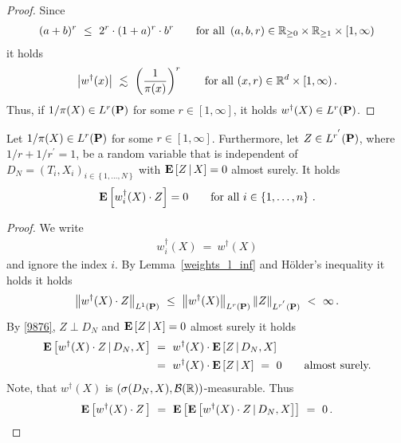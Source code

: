 \begin{proof}
  Since
  \begin{align*}
  (a+b)^r\
  \le \ 
  2^r\cdot (1+a)^r\cdot b^r
  \qquad
  \text{for all}\ 
  \left( a,b,r \right)
  \in
  \R_{\ge 0}\times\R_{\ge 1}\times [1,\infty)
  \end{align*}
 it holds
 \begin{align*}
   \left| w^\dagger(x) \right|
   \ 
   \lesssim
   \ 
   \left( 
     \frac{1}{\pi(x)}
   \right)^r
   \qquad
   \text{for all}\ 
   (x,r)\in\R^d\times [1,\infty)
   \,.
 \end{align*}
 Thus, if 
 $1/\pi(X)\in L^r(\P)$
 for some $r\in [1,\infty]$,
 it holds
 $w^\dagger(X)\in L^r(\P)$.
\end{proof}
\begin{lemma}
  \label{w.Z=0}
  Let 
 $1/\pi(X)\in L^r(\P)$
 for some $r\in [1,\infty]$.
 Furthermore, let 
 $Z\in L^{r^{'}}(\P)$,
 where
 $1/r + 1/r^{'}=1$,
  be a random variable that is independent of $D_N=(T_i,X_i)_{i\in \left\{
    1,\ldots,N
  \right\}}$ 
  with
  $
\E
\left[
  Z
  \,
  |
  \, 
  X
\right]
= 0
  $
  almost surely.
  It holds
  \begin{gather*}
  \E
  \left[
    w_i^\dagger(X)
  \cdot Z
  \right]
  =0
  \qquad
  \text{for all}
  \ 
  i\in \left\{ 1,\ldots,n \right\}
  \,.
  \end{gather*}
\end{lemma}
\begin{proof}
  We write
  \begin{gather*}
    w_i^\dagger(X)
  \ 
  =
  \ 
  w^\dagger(X)
  \end{gather*}
  and ignore the index $i$.
  By Lemma~\ref{weights_l_inf} and 
  Hölder's inequality it holds
  it holds
  \begin{gather}
    \label{9876}
    \norm{
  w^\dagger(X)\cdot Z
    }_{L^1(\P)}
    \ 
  \le
    \ 
  \norm{w^\dagger(X)}_{L^r(\P)}
  \norm{Z}_{L^{r^{'}}(\P)}
  \ 
  <
  \ 
  \infty
  \,.
  \end{gather}
  By 
  \eqref{9876},
  $Z\perp D_N$
  and
  $
\E
\left[
  Z
  \,
  |
  \, 
  X
\right]
= 0
  $
  almost surely
  it holds 
  \begin{align*}
    \E
  \left[
  w^\dagger(X)
  \cdot
  Z
  \,
  |
  \,
  D_N,X
  \right]
  &
  \ 
  =
  \ 
  w^\dagger(X)
  \cdot
  \E
  \left[
  Z
  \,
  |
  \,
  D_N,X
  \right]
  \\
  &
  \ 
  =
  \ 
  w^\dagger(X)
  \cdot
  \E
  \left[
  Z
  \,
  |
  \,
  X
  \right]
  \
  =
  \ 
  0
  \qquad
  \text{almost surely.}
  \end{align*}
  Note, that $w^\dagger(X)$ is 
  $
  \left(
  \sigma(D_N,X),\mathcal{B}(\R)
  \right)
  $-measurable.  
  Thus
  \begin{gather*}
    \E
    \left[
  w^\dagger(X)
  \cdot
  Z
  \,
    \right]
    \ 
    =
    \ 
    \E
    \left[
 \E
  \left[
  w^\dagger(X)
  \cdot
  Z
  \,
  |
  \,
  D_N,X
  \right]
    \right]
    \ 
    =
    \ 
    0
    \,.
     \end{gather*}
\end{proof}



